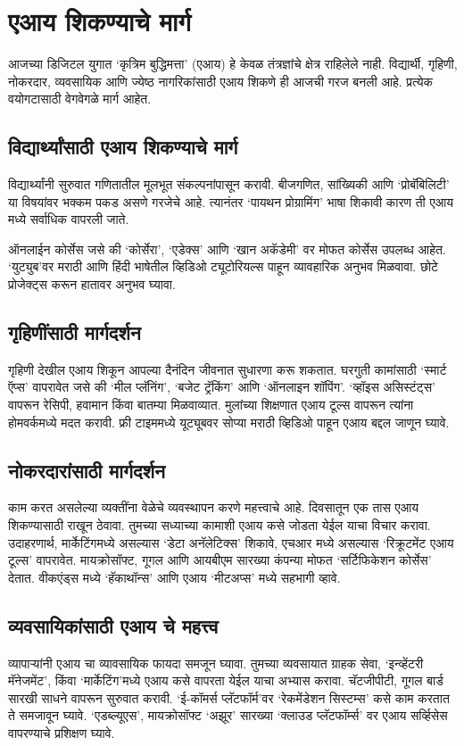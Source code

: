 \chapter{एआय शिकण्याचे मार्ग}

आजच्या डिजिटल युगात `कृत्रिम बुद्धिमत्ता' (एआय) हे केवळ तंत्रज्ञांचे क्षेत्र राहिलेले नाही. विद्यार्थी, गृहिणी, नोकरदार, व्यवसायिक आणि ज्येष्ठ नागरिकांसाठी एआय शिकणे ही आजची गरज बनली आहे. प्रत्येक वयोगटासाठी वेगवेगळे मार्ग आहेत.

\section*{विद्यार्थ्यांसाठी एआय शिकण्याचे मार्ग}

विद्यार्थ्यांनी सुरुवात गणितातील मूलभूत संकल्पनांपासून करावी. बीजगणित, सांख्यिकी आणि `प्रोबॅबिलिटी' या विषयांवर भक्कम पकड असणे गरजेचे आहे. त्यानंतर `पायथन प्रोग्रामिंग' भाषा शिकावी कारण ती एआय मध्ये सर्वाधिक वापरली जाते.

ऑनलाईन कोर्सेस जसे की `कोर्सेरा', `एडेक्स'  आणि `खान अकॅडेमी' वर मोफत कोर्सेस उपलब्ध आहेत. `युट्युब'वर मराठी आणि हिंदी भाषेतील व्हिडिओ ट्यूटोरियल्स पाहून व्यावहारिक अनुभव मिळवावा. छोटे प्रोजेक्ट्स करून हातावर अनुभव घ्यावा.

\section*{गृहिणींसाठी  मार्गदर्शन}
गृहिणी देखील एआय शिकून आपल्या दैनंदिन जीवनात सुधारणा करू शकतात. घरगुती कामांसाठी `स्मार्ट ऍप्स' वापरावेत जसे की `मील प्लॅनिंग', `बजेट ट्रॅकिंग' आणि `ऑनलाइन शॉपिंग'. `व्हॉइस असिस्टंट्स' वापरून रेसिपी, हवामान किंवा बातम्या मिळवाव्यात. मुलांच्या शिक्षणात एआय टूल्स वापरून त्यांना होमवर्कमध्ये मदत करावी. फ्री टाइममध्ये यूट्यूबवर सोप्या मराठी व्हिडिओ पाहून एआय बद्दल जाणून घ्यावे.

\section*{नोकरदारांसाठी मार्गदर्शन}
काम करत असलेल्या व्यक्तींना वेळेचे व्यवस्थापन करणे महत्त्वाचे आहे. दिवसातून एक तास एआय शिकण्यासाठी राखून ठेवावा. तुमच्या सध्याच्या कामाशी एआय कसे जोडता येईल याचा विचार करावा.
उदाहरणार्थ, मार्केटिंगमध्ये असल्यास `डेटा अनॅलेटिक्स' शिकावे, एचआर मध्ये असल्यास `रिक्रूटमेंट एआय टूल्स' वापरावेत. मायक्रोसॉफ्ट, गूगल आणि आयबीएम सारख्या कंपन्या मोफत `सर्टिफिकेशन कोर्सेस' देतात. वीकएंड्स मध्ये `हॅकाथॉन्स' आणि एआय `मीटअप्स' मध्ये सहभागी व्हावे.

\section*{व्यवसायिकांसाठी एआय चे महत्त्व}
व्यापार्‍यांनी एआय चा व्यावसायिक फायदा समजून घ्यावा. तुमच्या व्यवसायात ग्राहक सेवा, `इन्व्हेंटरी मॅनेजमेंट', किंवा `मार्केटिंग'मध्ये एआय कसे वापरता येईल याचा अभ्यास करावा.
चॅटजीपीटी, गूगल बार्ड सारखी साधने वापरून सुरुवात करावी. `ई-कॉमर्स प्लॅटफॉर्म'वर `रेकमेंडेशन सिस्टम्स' कसे काम करतात ते समजावून घ्यावे. `एडब्ल्यूएस', मायक्रोसॉफ्ट `अझूर' सारख्या `क्लाउड प्लॅटफॉर्म्स' वर एआय सर्व्हिसेस वापरण्याचे प्रशिक्षण घ्यावे.

